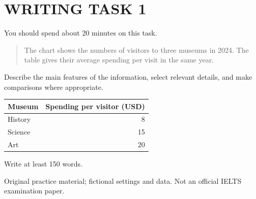 \section*{WRITING TASK 1}
You should spend about 20 minutes on this task.

\begin{quote}\large The chart shows the numbers of visitors to three museums in 2024. The table gives their average spending per visit in the same year.
\end{quote}
Describe the main features of the information, select relevant details, and make comparisons where appropriate.

\begin{center}
\par\bigskip\begin{tabular}{|l|r|}\hline Museum & Spending per visitor (USD)\\\hline History & 8\\Science & 15\\Art & 20\\\hline\end{tabular}
\end{center}
Write at least 150 words.
\par\bigskip
{\footnotesize\color{gray} Original practice material; fictional settings and data. Not an official IELTS examination paper.}
